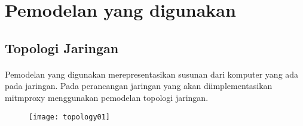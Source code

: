 \documentclass[./bab_3.tex]{subfiles}
\begin{document}
  \section{Pemodelan yang digunakan}
  \subsection{Topologi Jaringan}
  \paragraph*{}Pemodelan yang digunakan merepresentasikan
  susunan dari komputer yang ada pada jaringan. Pada
  perancangan jaringan yang akan diimplementasikan mitmproxy
  menggunakan pemodelan topologi jaringan.
  \begin{figure}[hbt!]
  \centering
    \texttt{[image: topology01]}
  \end{figure}
\end{document}
